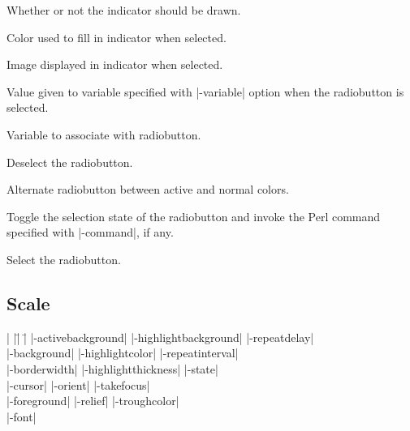 \vskip5pt
\begin{enum}{1cm}

 Whether  or  not the indicator should be drawn.

 Color used to fill in indicator when selected.

 Image displayed in indicator when selected.

 Value given to variable specified with |-variable|
option when the radiobutton is selected.

 Variable to associate with radiobutton.

\end{enum}

\vskip5pt
\begin{enum}{1cm}

 Deselect the radiobutton. 

 Alternate radiobutton between 
active and normal colors.

 Toggle the selection state 
of the radiobutton and invoke the Perl command specified with |-command|, if any.

 Select the radiobutton.

\end{enum}

\subsection*{Scale}
\vspace{-4pt}

\begin{tabbing}
|                   |\=|                     |\= \kill
|-activebackground| \> |-highlightbackground| \> |-repeatdelay| \\  
|-background|       \> |-highlightcolor|     \> |-repeatinterval| \\ 
|-borderwidth|      \> |-highlightthickness| \> |-state| \\         
|-cursor|           \> |-orient|             \> |-takefocus| \\   
|-foreground|       \> |-relief| 	     \> |-troughcolor| \\   
|-font| \\
\end{tabbing}

